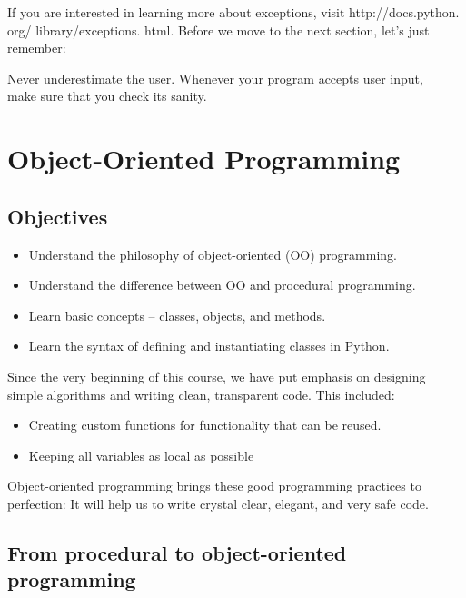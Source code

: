\documentclass[article,A4,12pt]{llncs}
\begin{document}
\noindent
If you are interested in 
learning more about exceptions, visit http://docs.python. org/ library/exceptions. html.
Before we move to the next section, let's just remember:\\

\begin{gbox}
\begin{center}
Never underestimate the user. Whenever your program accepts user 
input,\\ make sure that you check its sanity. 
\end{center}
\end{gbox}
\vspace{6mm}

\noindent


\section{Object-Oriented Programming}

\subsection{Objectives}

\begin{itemize}
\item Understand the philosophy of object-oriented (OO) programming.
\item Understand the difference between OO and procedural programming.
\item Learn basic concepts -- classes, objects, and methods.
\item Learn the syntax of defining and instantiating classes in Python.
\end{itemize}
Since the very beginning of this course, 
we have put emphasis on designing simple algorithms
and writing clean, transparent code. This included:
\begin{itemize}
\item Creating custom functions for functionality that can be reused.
\item Keeping all variables as local as possible
\end{itemize}
Object-oriented programming brings these good programming practices to
perfection: It will help us to write crystal clear, elegant, and very safe code.

\subsection{From procedural to object-oriented programming}
\end{document}
